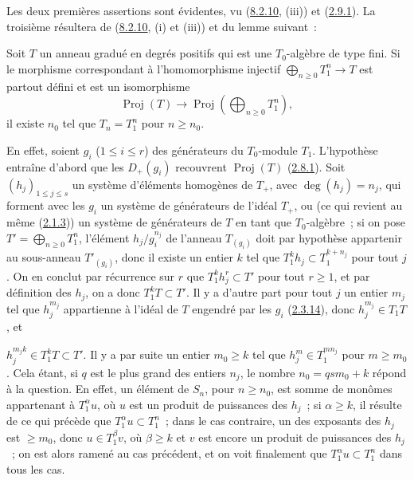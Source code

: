 Les deux premières assertions sont évidentes, vu
(\hyperref[II.8.2.10-fr]{8.2.10}, (iii)) et
(\hyperref[II.2.9.1-fr]{2.9.1}). La troisième résultera de
(\hyperref[II.8.2.10-fr]{8.2.10}, (i) et (iii)) et du lemme suivant~:

\begin{lemma}[8.2.14.1]
\label{II.8.2.14.1-fr}
Soit $T$ un anneau gradué en degrés positifs qui est une $T_0$-algèbre de type
fini. Si le morphisme correspondant à l'homomorphisme injectif
$\bigoplus_{n\geq0}T_1^n\to T$ est partout défini et est un isomorphisme
\[
  \operatorname{Proj}(T)\to
  \operatorname{Proj}\left(\bigoplus_{n\geq0}T_1^n\right),
\]
il existe $n_0$ tel que $T_n=T_1^n$ pour $n\geq n_0$.
\end{lemma}

En effet, soient $g_i$ ($1\leq i\leq r$) des générateurs du $T_0$-module
$T_1$. L'hypothèse entraîne d'abord que les $D_+(g_i)$ recouvrent
$\operatorname{Proj}(T)$ (\hyperref[II.2.8.1-fr]{2.8.1}). Soit
$(h_j)_{1\leq j\leq s}$ un système d'éléments homogènes de $T_+$, avec
$\deg(h_j)=n_j$, qui forment avec les $g_i$ un système de générateurs de
l'idéal $T_+$, ou (ce qui revient au même
(\hyperref[II.2.1.3-fr]{2.1.3})) un système de générateurs de $T$ en tant que
$T_0$-algèbre~; si on pose $T'=\bigoplus_{n\geq0}T_1^n$, l'élément
$h_j/g_i^{n_j}$ de l'anneau $T_{(g_i)}$ doit par hypothèse appartenir au
sous-anneau $T'_{(g_i)}$, donc il existe un entier $k$ tel que
$T_1^k h_j\subset T_1^{k+n_j}$ pour tout $j$. On en conclut par récurrence
sur $r$ que $T_1^k h_j^r\subset T'$ pour tout $r\geq1$, et par définition des
$h_j$, on a donc $T_1^kT\subset T'$. Il y a d'autre part pour tout $j$ un
entier $m_j$ tel que $h_j^{m_j}$ appartienne à l'idéal de $T$ engendré par
les $g_i$ (\hyperref[II.2.3.14-fr]{2.3.14}), donc $h_j^{m_j}\in T_1T$, et

$h_j^{m_jk}\in T_1^kT\subset T'$. Il y a par suite un entier $m_0\geq k$ tel
que $h_j^m\in T_1^{mn_j}$ pour $m\geq m_0$. Cela étant, si $q$ est le plus
grand des entiers $n_j$, le nombre $n_0=qsm_0+k$ répond à la question. En
effet, un élément de $S_n$, pour $n\geq n_0$, est somme de monômes appartenant
à $T_1^\alpha u$, où $u$ est un produit de puissances des $h_j$~; si
$\alpha\geq k$, il résulte de ce qui précède que $T_1^\alpha u\subset T_1^n$~;
dans le cas contraire, un des exposants des $h_j$ est $\geq m_0$, donc
$u\in T_1^\beta v$, où $\beta\geq k$ et $v$ est encore un produit de
puissances des $h_j$~; on est alors ramené au cas précédent, et on voit
finalement que $T_1^\alpha u\subset T_1^n$ dans tous les cas.

